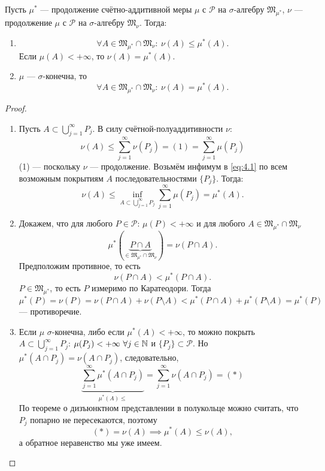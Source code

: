 \begin{theorem}
    Пусть $\mu^*$ — продолжение счётно-аддитивной меры $\mu$ с $\mathcal{P}$ на $\sigma$-алгебру $\mathfrak{M}_{\mu^*}$, $\nu$ — продолжение $\mu$ с $\mathcal{P}$ на $\sigma$-алгебру $\mathfrak{M}_{\nu}$.
    Тогда:
    \begin{enumerate}
        \item \[\forall A \in \mathfrak{M}_{\mu^*} \cap \mathfrak{M}_{\nu}: \ \nu(A) \leqslant \mu^*(A).\]
        Если $\mu(A) < +\infty$, то $\nu(A) = \mu^*(A)$.
        \item $\mu$ — $\sigma$-конечна, то 
        \[\forall A \in \mathfrak{M}_{\mu^*} \cap \mathfrak{M}_{\nu}: \ \nu(A) = \mu^*(A).\]
    \end{enumerate}
\end{theorem} 
\begin{proof}\tab
    \begin{enumerate}
        \item Пусть $A \subset \bigcup\limits_{j=1}^{\infty} P_j$.
        В силу счётной-полуаддитивности $\nu$:
        \begin{equation}
            \nu(A) \leqslant \sum\limits_{j=1}^{\infty} \nu(P_j) = (1) = \sum\limits_{j=1}^{\infty} \mu(P_j) \label{eq:4.1}
        \end{equation}
        (1) — поскольку $\nu$ — продолжение.
        Возьмём инфимум в \eqref{eq:4.1} по всем возможным покрытиям $A$ последовательностями $\{P_j\}$. Тогда:
        \[\nu(A) \leqslant \inf\limits_{A \subset \bigcup\limits_{j=1}^{\infty} P_j} \sum\limits_{j=1}^{\infty} \mu(P_j) = \mu^*(A).\]

        \item Докажем, что для любого $P \in \mathcal{P}$: $\mu(P) < +\infty$ и для любого $A \in \mathfrak{M}_{\mu^*} \cap \mathfrak{M}_{\nu}$
        \[\mu^*(\underbrace{P \cap A}_{\in \mathfrak{M}_{\mu^*} \cap \mathfrak{M}_{\nu}}) = \nu(P \cap A).\]
        Предположим противное, то есть
        \[\nu(P \cap A) < \mu^*(P \cap A).\]
        $P \in \mathfrak{M}_{\mu^*}$, то есть $P$ измеримо по Каратеодори.
        Тогда 
        \[\mu^*(P) = \nu(P) = \nu(P \cap A) + \nu(P \setminus A) < \mu^*(P \cap A) + \mu^*(P \setminus A) = \mu^*(P)\]
        — противоречие.

        \item Если $\mu$ $\sigma$-конечна, либо если $\mu^*(A) < +\infty$, то можно покрыть $A \subset \bigcup\limits_{j=1}^{\infty} P_j$: $\mu(P_j) < +\infty \ \forall j \in \mathbb{N}$ и $\{P_j\} \subset \mathcal{P}$.
        Но $\mu^*(A \cap P_j) = \nu(A \cap P_j)$, следовательно,
        \[\underbrace{\sum\limits_{j=1}^{\infty}\mu^*(A \cap P_j)}_{\mu^*(A) \leqslant} = \sum\limits_{j=1}^{\infty} \nu(A \cap P_j) = (*)\]
        По теореме о дизъюнктном представлении в полукольце можно считать, что $P_j$ попарно не пересекаются, поэтому
        \[(*) = \nu(A) \implies \mu^*(A) \leqslant \nu(A),\]
        а обратное неравенство мы уже имеем.
    \end{enumerate}
\end{proof} 

